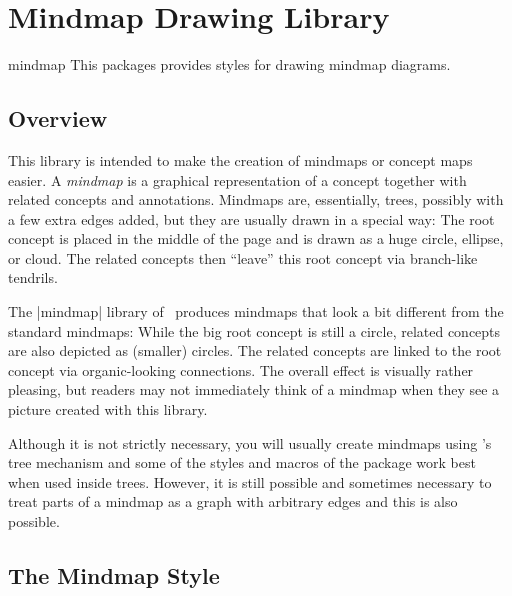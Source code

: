 %
%
%


\section{Mindmap Drawing Library}

\begin{tikzlibrary}{mindmap}
    This packages provides styles for drawing mindmap diagrams.
\end{tikzlibrary}


\subsection{Overview}

This library is intended to make the creation of mindmaps or concept maps
easier. A \emph{mindmap} is a graphical representation of a concept together
with related concepts and annotations. Mindmaps are, essentially, trees,
possibly with a few extra edges added, but they are usually drawn in a special
way: The root concept is placed in the middle of the page and is drawn as a
huge circle, ellipse, or cloud. The related concepts then ``leave'' this root
concept via branch-like tendrils.

The |mindmap| library of \tikzname\ produces mindmaps that look a bit different
from the standard mindmaps: While the big root concept is still a circle,
related concepts are also depicted as (smaller) circles. The related concepts
are linked to the root concept via organic-looking connections. The overall
effect is visually rather pleasing, but readers may not immediately think of a
mindmap when they see a picture created with this library.

Although it is not strictly necessary, you will usually create mindmaps using
\tikzname's tree mechanism and some of the styles and macros of the package
work best when used inside trees. However, it is still possible and sometimes
necessary to treat parts of a mindmap as a graph with arbitrary edges and this
is also possible.


\subsection{The Mindmap Style}

